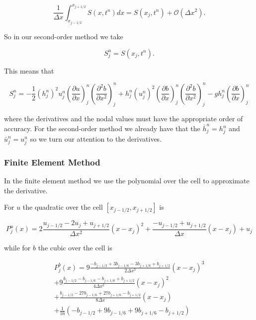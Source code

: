 \begin{equation*}
\frac{1}{\Delta x}\int^{x_{j+1/2}}_{x_{j-1/2}} S (x,t^n) dx = S (x_j,t^n) + \mathcal{O} \left(\Delta x^2\right).
\end{equation*}

So in our second-order method we take

\begin{equation*}
S^n_j = S (x_j,t^n).
\end{equation*}

This means that

\begin{equation}
 S^n_j = -\frac{1}{2}\left(h^n_j\right)^2 {u^n_j}\left( \frac{\partial {u}}{\partial x} \right)^n_j \left(\frac{\partial^2 b}{\partial x^2} \right)^n_j  + h^n_j \left(u^n_j\right)^2 \left(\frac{\partial b}{\partial x}\right)^n_j \left(\frac{\partial^2 b}{\partial x^2}\right)^n_j - gh^n_j\left(\frac{\partial b}{\partial x}\right)^n_j
\end{equation}

where the derivatives and the nodal values must have the appropriate order of accuracy. For the second-order method we already have that the $\bar{h}^n_j =h^n_j$ and $\bar{u}^n_j = u^n_j$ so we turn our attention to the derivatives.  

\subsubsection{Finite Element Method}
In the finite element method we use the polynomial over the cell to approximate the derivative.

For $u$ the quadratic over the cell $\left[x_{j-1/2}, x_{j+1/2}\right]$ is

\begin{equation}
P^u_j(x) = 2\frac{u_{j-1/2} - 2u_{j} + u_{j+1/2}}{\Delta x ^2} \left(x - x_j\right)^2 + \frac{-u_{j-1/2} + u_{j+1/2}}{\Delta x} \left(x - x_j\right) + u_j
\end{equation}

while for $b$ the cubic over the cell is

\begin{multline}
P^b_j(x)= 9\frac{-b_{j-1/2} + 3 b_{j-1/6} - 3 b_{j+1/6} + b_{j+1/2}}{2\Delta x^3} \left(x - x_j\right)^3 \\+  9\frac{b_{j-1/2} - b_{j-1/6} -  b_{j+1/6} + b_{j+1/2}}{4\Delta x^2} \left(x - x_j\right)^2 \\+  \frac{b_{j-1/2} - 27b_{j-1/6} + 27b_{j+1/6} - b_{j+1/2}}{8\Delta x} \left(x - x_j\right) \\  + \frac{1}{16}\left(-b_{j-1/2} + 9 b_{j-1/6} + 9b_{j+1/6} - b_{j+1/2}\right)
\end{multline}

